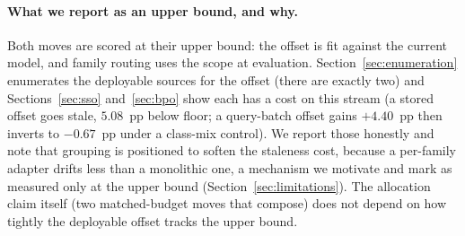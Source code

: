 \paragraph{What we report as an upper bound, and why.}
Both moves are scored at their upper bound: the offset is fit against the current
model, and family routing uses the scope at evaluation. Section~\ref{sec:enumeration}
enumerates the deployable sources for the offset (there are exactly two) and
Sections~\ref{sec:sso} and~\ref{sec:bpo} show each has a cost on this stream (a
stored offset goes stale, $5.08$~pp below floor; a query-batch offset gains
$+4.40$~pp then inverts to $-0.67$~pp under a class-mix control). We report those
honestly and note that grouping is positioned to soften the staleness cost, because
a per-family adapter drifts less than a monolithic one, a mechanism we motivate
and mark as measured only at the upper bound (Section~\ref{sec:limitations}). The
allocation claim itself (two matched-budget moves that compose) does not depend
on how tightly the deployable offset tracks the upper bound.


